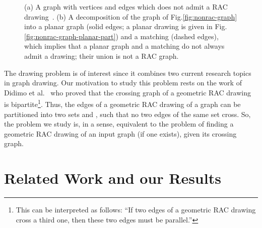 \documentclass{llncs}
\begin{document}
\begin{figure}[t!hb]
  \centering
  \begin{minipage}[b]{.28\textwidth}
     \centering
  \end{minipage}
  \hfill
  \begin{minipage}[b]{.28\textwidth}
     \centering
  \end{minipage}
  \hfill
  \begin{minipage}[b]{.37\textwidth}
     \centering
  \end{minipage}
  \caption{(a) A graph with  vertices and  edges which does not admit a RAC drawing\
  \cite{EL11}. (b) A decomposition of the
  graph of Fig.\ref{fig:nonrac-graph} into a planar graph (solid edges; a planar drawing is
  given in Fig.\ref{fig:nonrac-graph-planar-part}) and a matching (dashed edges),
  which implies that a planar graph and a matching do not always admit a  drawing; their union is not a RAC graph.}
  \label{fig:nonrac-graph-example}
\end{figure}

The  drawing problem is of
interest since it combines two current research topics in graph
drawing. Our motivation to study this
problem rests on the work of Didimo et al.\ \cite{DEL09} who proved
that the crossing graph of a geometric RAC drawing is
bipartite\footnote{This can be interpreted as follows: ``If two
edges of a geometric RAC drawing cross a third one, then these two
edges must be parallel.''}. Thus, the edges of a geometric RAC
drawing of a graph  can be partitioned into two sets 
and , such that no two edges of the same set cross. So, the
problem we study is, in a sense, equivalent to the problem of
finding a geometric RAC drawing of an input graph (if one exists),
given its crossing graph.

\section{Related Work and our Results}
\label{sec:related-work}
\end{document}
